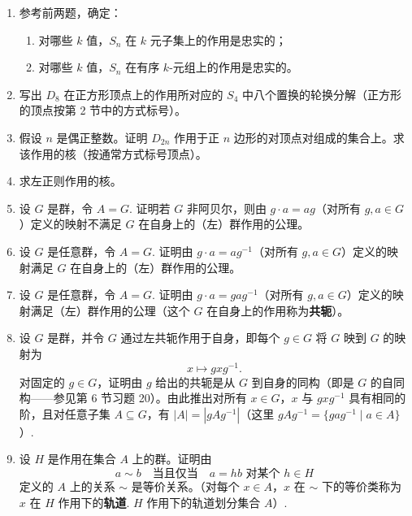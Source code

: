 \begin{enumerate}
\item 参考前两题，确定：
\begin{enumerate}[label=(\alph*)]
\item 对哪些 \( k \) 值，\( S_n \) 在 \( k \) 元子集上的作用是忠实的；
\item 对哪些 \( k \) 值，\( S_n \) 在有序 \( k \)-元组上的作用是忠实的。
\end{enumerate}

\item 写出 \( D_8 \) 在正方形顶点上的作用所对应的 \( S_4 \) 中八个置换的轮换分解（正方形的顶点按第 2 节中的方式标号）。

\item 假设 \( n \) 是偶正整数。证明 \( D_{2n} \) 作用于正 \( n \) 边形的对顶点对组成的集合上。求该作用的核（按通常方式标号顶点）。

\item 求左正则作用的核。

\item 设 \( G \) 是群，令 \( A = G \). 证明若 \( G \) 非阿贝尔，则由 \( g \cdot a = ag \)（对所有 \( g, a \in G \)）定义的映射不满足 \( G \) 在自身上的（左）群作用的公理。

\item 设 \( G \) 是任意群，令 \( A = G \). 证明由 \( g \cdot a = ag^{-1} \)（对所有 \( g, a \in G \)）定义的映射满足 \( G \) 在自身上的（左）群作用的公理。

\item 设 \( G \) 是任意群，令 \( A = G \). 证明由 \( g \cdot a = gag^{-1} \)（对所有 \( g, a \in G \)）定义的映射满足（左）群作用的公理（这个 \( G \) 在自身上的作用称为\textbf{共轭}）。

\item 设 \( G \) 是群，并令 \( G \) 通过左共轭作用于自身，即每个 \( g \in G \) 将 \( G \) 映到 \( G \) 的映射为
\[
x \mapsto gxg^{-1}.
\]
对固定的 \( g \in G \)，证明由 \( g \) 给出的共轭是从 \( G \) 到自身的同构（即是 \( G \) 的自同构——参见第 6 节习题 20）。由此推出对所有 \( x \in G \)，\( x \) 与 \( gxg^{-1} \) 具有相同的阶，且对任意子集 \( A \subseteq G \)，有 \( |A| = |gAg^{-1}| \)（这里 \( gAg^{-1} = \{ gag^{-1} \mid a \in A \} \)）.

\item 设 \( H \) 是作用在集合 \( A \) 上的群。证明由
\[
a \sim b \quad \text{当且仅当} \quad a = hb \text{ 对某个 } h \in H
\]
定义的 \( A \) 上的关系 \( \sim \) 是等价关系。（对每个 \( x \in A \)，\( x \) 在 \( \sim \) 下的等价类称为 \( x \) 在 \( H \) 作用下的\textbf{轨道}. \( H \) 作用下的轨道划分集合 \( A \)）.


\end{enumerate}
